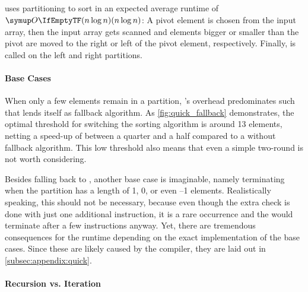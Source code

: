 \subsection{\texorpdfstring{\QS{}}{QuickSort}}


\QS{} uses partitioning to sort in an expected average runtime of \(\bigoh{n \log n}\):
A pivot element is chosen from the input array, then the input array gets scanned and elements bigger or smaller than the pivot are moved to the right or left of the pivot element, respectively.
Finally, \QS{} is called on the left and right partitions.

\paragraph{Base Cases}
When only a few elements remain in a partition, \QS{}'s overhead predominates such that \IS{} lends itself as fallback algorithm.
As \cref{fig:quick_fallback} demonstrates, the optimal threshold for switching the sorting algorithm is around 13 elements, netting a speed-up of between a quarter and a half compared to a \QS{} without fallback algorithm.
This low threshold also means that even a simple two-round \ShS{} is not worth considering.

Besides falling back to \IS{}, another base case is imaginable, namely terminating when the partition has a length of 1, 0, or even --1 elements.
Realistically speaking, this should not be necessary, because even though the extra check is done with just one additional instruction, it is a rare occurrence and the \IS{} would terminate after a few instructions anyway.
Yet, there are tremendous consequences for the runtime depending on the exact implementation of the base cases.
Since these are likely caused by the compiler, they are laid out in \cref{subsec:appendix:quick}.

\paragraph{Recursion vs. Iteration}

